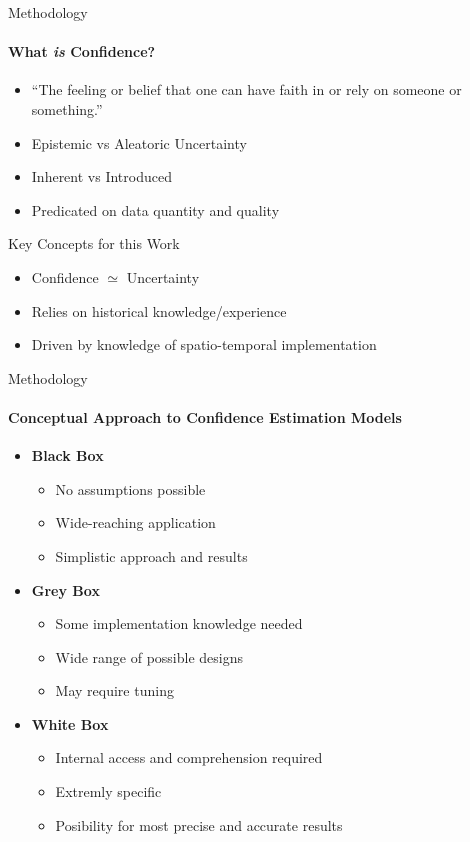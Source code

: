 \documentclass{beamer}
\begin{document}
\begin{frame}[t]{Methodology}
  \framesubtitle{What \emph{is} Confidence?}

  \begin{itemize}
    \item “The feeling or belief that one can have faith in or rely on someone or something.” \cite{Confidence2019}
    \item Epistemic vs Aleatoric Uncertainty
    \item Inherent vs Introduced
    \item Predicated on data quantity and quality
  \end{itemize}

  \begin{block}{Key Concepts for this Work}
    \begin{itemize}
      \item Confidence $\simeq$ Uncertainty \cite{Geifman2018}
      \item Relies on historical knowledge/experience
      \item Driven by knowledge of spatio-temporal implementation
    \end{itemize}
  \end{block}

\end{frame}



\begin{frame}[t]{Methodology}
  \framesubtitle{Conceptual Approach to Confidence Estimation Models}
  \begin{itemize}
    \setlength\itemsep{1em}
  \item \textbf{Black Box}
      \begin{itemize}
        \item No assumptions possible
        \item Wide-reaching application
        \item Simplistic approach and results
      \end{itemize}

    \item \textbf{Grey Box}
      \begin{itemize}
        \item Some implementation knowledge needed
        \item Wide range of possible designs
        \item May require tuning
      \end{itemize}

    \item \textbf{White Box}
      \begin{itemize}
        \item Internal access and comprehension required
        \item Extremly specific
        \item Posibility for most precise and accurate results
      \end{itemize}

  \end{itemize}
\end{frame}
\end{document}
